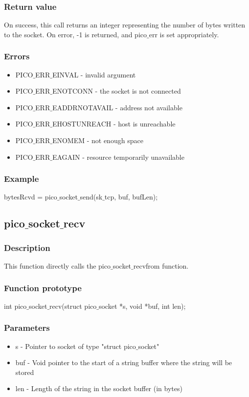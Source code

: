 \subsubsection*{Return value}
On success, this call returns an integer representing the number of bytes written to
the socket. On error, -1 is returned, and pico$\_$err is set appropriately.

\subsubsection*{Errors}
\begin{itemize}
\item PICO$\_$ERR$\_$EINVAL - invalid argument
\item PICO$\_$ERR$\_$ENOTCONN - the socket is not connected
\item PICO$\_$ERR$\_$EADDRNOTAVAIL - address not available
\item PICO$\_$ERR$\_$EHOSTUNREACH - host is unreachable
\item PICO$\_$ERR$\_$ENOMEM - not enough space
\item PICO$\_$ERR$\_$EAGAIN - resource temporarily unavailable
\end{itemize}

\subsubsection*{Example}
bytesRcvd = pico$\_$socket$\_$send(sk$\_$tcp, buf, bufLen);


\subsection{pico$\_$socket$\_$recv}

\subsubsection*{Description}
This function directly calls the pico$\_$socket$\_$recvfrom function.

\subsubsection*{Function prototype}
int pico$\_$socket$\_$recv(struct pico$\_$socket *s, void *buf, int len);

\subsubsection*{Parameters}
\begin{itemize}
\item s - Pointer to socket of type "struct pico$\_$socket"
\item buf - Void pointer to the start of a string buffer where the string will be stored
\item len - Length of the string in the socket buffer (in bytes)
\end{itemize}

